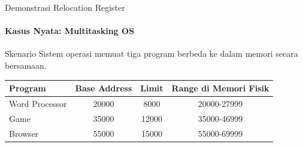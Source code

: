 \documentclass[10pt,aspectratio=169]{beamer}
\begin{document}
\begin{frame}{Demonstrasi Relocation Register}
    \framesubtitle{Kasus Nyata: Multitasking OS}
    
    \begin{block}{Skenario}
        Sistem operasi memuat tiga program berbeda ke dalam memori secara bersamaan.
    \end{block}

    \begin{center}
        \begin{tabular}{|l|c|c|c|}
            \hline
            \textbf{Program} & \textbf{Base Address} & \textbf{Limit} & \textbf{Range di Memori Fisik} \\
            \hline
            Word Processor & 20000 & 8000 & 20000-27999 \\
            \hline
            Game & 35000 & 12000 & 35000-46999 \\
            \hline
            Browser & 55000 & 15000 & 55000-69999 \\
            \hline
        \end{tabular}
    \end{center}
\end{frame}
\end{document}
